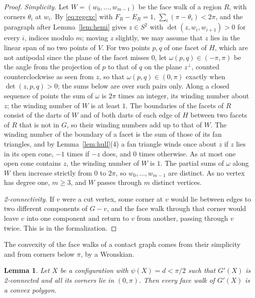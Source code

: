 \documentclass[12pt]{amsart}
\newtheorem{lemma}[theorem]{Lemma}
\theoremstyle{definition}
\theoremstyle{plain}
\theoremstyle{definition}
\newcommand{\Sph}{S^2}
\newcommand{\leanmap}[1]{\ignorespaces}
\newcommand{\mapnote}[1]{\ignorespaces}
\begin{document}
\begin{proof}
\emph{Simplicity.} Let $W=(w_0,\dots,w_{m-1})$ be the face walk of a region $R$, with corners $\theta_i$ at $w_i$. By \eqref{eq:regexc} with $F_R-E_R=1$, $\sum_i(\pi-\theta_i)<2\pi$, and the paragraph after Lemma~\ref{lem:hemi} gives $z\in\Sph$ with $\det(z,w_i,w_{i+1})>0$ for every $i$, indices modulo $m$; moving $z$ slightly, we may assume that $z$ lies in the linear span of no two points of $V$. For two points $p,q$ of one facet of $H$, which are not antipodal since the plane of the facet misses $0$, let $\omega(p,q)\in(-\pi,\pi)$ be the angle from the projection of $p$ to that of $q$ on the plane $z^\perp$, counted counterclockwise as seen from $z$, so that $\omega(p,q)\in(0,\pi)$ exactly when $\det(z,p,q)>0$; the sums below are over such pairs only. Along a closed sequence of points the sum of $\omega$ is $2\pi$ times an integer, its winding number about $z$; the winding number of $W$ is at least $1$. The boundaries of the facets of $R$ consist of the darts of $W$ and of both darts of each edge of $H$ between two facets of $R$ that is not in $G$, so their winding numbers add up to that of $W$. The winding number of the boundary of a facet is the sum of those of its fan triangles, and by Lemma~\ref{lem:hull}(4) a fan triangle winds once about $z$ if $z$ lies in its open cone, $-1$ times if $-z$ does, and $0$ times otherwise. As at most one open cone contains $z$, the winding number of $W$ is $1$. The partial sums of $\omega$ along $W$ then increase strictly from $0$ to $2\pi$, so $w_0,\dots,w_{m-1}$ are distinct. As no vertex has degree one, $m\ge3$, and $W$ passes through $m$ distinct vertices.

\emph{2-connectivity.} If $v$ were a cut vertex, some corner at $v$ would lie between edges to two different components of $G-v$, and the face walk through that corner would leave $v$ into one component and return to $v$ from another, passing through $v$ twice. This is  in the formalization.
\end{proof}

The convexity of the face walks of a contact graph comes from their simplicity and from corners below $\pi$, by a Wronskian.

\begin{lemma}\label{lem:convex}\leanmap{Tammes15.FaceChain.Setup.strictSupportFace, Tammes15.FaceChain.faceconvex_contact, Tammes15.StrictSupportFace}\mapnote{for the faces of a contact graph, in the cone form of Section \ref{sec:eightpoint}: along each face orbit, every vertex that is not an end of a side lies strictly on the left of the great circle of that side; proved from the 2-connectivity through the chain of lemmas on the faces of a contact graph of the eight-point proof}
Let $X$ be a configuration with $\psi(X)=d<\pi/2$ such that $G'(X)$ is 2-connected and all its corners lie in $(0,\pi)$. Then every face walk of $G'(X)$ is a convex polygon.
\end{lemma}
\end{document}
